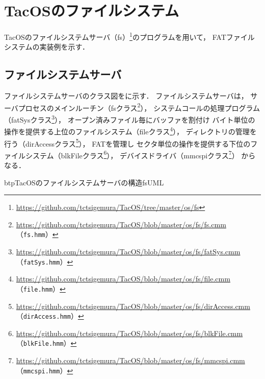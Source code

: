 \chapter{TacOSのファイルシステム}
\label{tacosFAT}

TacOSのファイルシステムサーバ（fs）\footnote{
  \url{https://github.com/tctsigemura/TacOS/tree/master/os/fs}
}のプログラムを用いて，
FATファイルシステムの実装例を示す．

\section{ファイルシステムサーバ}
ファイルシステムサーバのクラス図をに示す．
ファイルシステムサーバは，
サーバプロセスのメインルーチン（fsクラス\footnote{
  \url{https://github.com/tctsigemura/TacOS/blob/master/os/fs/fs.cmm}
  （\texttt{fs.hmm}）}），
システムコールの処理プログラム（fatSysクラス\footnote{
  \url{https://github.com/tctsigemura/TacOS/blob/master/os/fs/fatSys.cmm}
  （\texttt{fatSys.hmm}）}），
オープン済みファイル毎にバッファを割付け
バイト単位の操作を提供する上位のファイルシステム（fileクラス\footnote{
  \url{https://github.com/tctsigemura/TacOS/blob/master/os/fs/file.cmm}
  （\texttt{file.hmm}）}），
ディレクトリの管理を行う（dirAccessクラス\footnote{
  \url{https://github.com/tctsigemura/TacOS/blob/master/os/fs/dirAccess.cmm}
  （\texttt{dirAccess.hmm}）}），
FATを管理し
セクタ単位の操作を提供する下位のファイルシステム（blkFileクラス\footnote{
  \url{https://github.com/tctsigemura/TacOS/blob/master/os/fs/blkFile.cmm}
  （\texttt{blkFile.hmm}）}），
デバイスドライバ（mmcspiクラス\footnote{
  \url{https://github.com/tctsigemura/TacOS/blob/master/os/fs/mmcspi.cmm}
  （\texttt{mmcspi.hmm}）}）
からなる．

\begin{myfig}{btp}{TacOSのファイルシステムサーバの構造}{fsUML}
\end{myfig}

